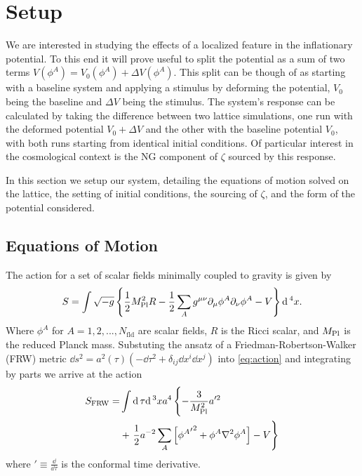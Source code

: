 
\section{Setup} \label{sec:setup}
We are interested in studying the effects of a localized feature in the inflationary potential.
To this end it will prove useful to split the potential as a sum of two terms $V(\phi^A) = V_0(\phi^A) + \Delta V(\phi^A)$.
This split can be though of as starting with a baseline system and applying a stimulus by deforming the potential, $V_0$ being the baseline and $\Delta V$ being the stimulus.
The system's response can be calculated by taking the difference between two lattice simulations, one run with the deformed potential $V_0+\Delta V$ and the other with the baseline potential $V_0$, with both runs starting from identical initial conditions.
Of particular interest in the cosmological context is the NG component of $\zeta$ sourced by this response.

In this section we setup our system, detailing the equations of motion solved on the lattice, the setting of initial conditions, the sourcing of $\zeta$, and the form of the potential considered.

\subsection{Equations of Motion}

The action for a set of scalar fields minimally coupled to gravity is given by
\begin{equation} \label{eq:action}
  S = \int \sqrt{-g}\left\{\frac{1}{2}M_{\mathrm{Pl}}^2R - \frac{1}{2}\sum_Ag^{\mu\nu}\partial_\mu\phi^A\partial_\nu\phi^A - V \right\}\mathrm{d}\,^4x.
\end{equation}
Where $\phi^A$ for $A=1,2,...,N_\mathrm{fld}$ are scalar fields, $R$ is the Ricci scalar, and $M_{\mathrm{Pl}}$ is the reduced Planck mass. 
Substuting the ansatz of a Friedman-Robertson-Walker (FRW) metric $\dd s^2 = a^2(\tau)\left( -\dd\tau^2 + \delta_{ij}\dd x^i\dd x^j \right)$ into \eqref{eq:action} and integrating by parts we arrive at the action
\begin{align} \label{eq:actionFRW}
  \begin{split}
    S_{\mathrm{FRW}} = &\int \dd\tau\dd^3xa^4\left\{
    - \frac{3}{\mpl^2}a'^2 \vphantom{\sum_A}\right. \\
    & + \left.\frac{1}{2}a^{-2}\sum_A\left[{{\phi^A}'}^2
      + \phi^A\nabla^2\phi^A\right] %
      - V \right\}
    \end{split}
\end{align}
where ${}' \equiv \frac{\dd}{\dd\tau}$ is the conformal time derivative.

